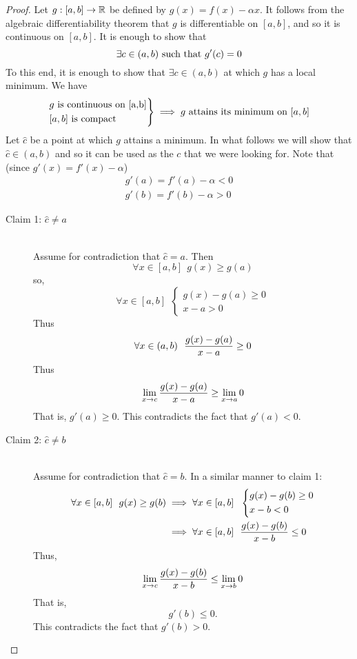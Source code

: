 \begin{proof}
    Let $g:[a,b] \to \mathbb{R}$ be defined by $g(x) = f(x) - \alpha x.$ It follows from the algebraic differentiability theorem that $g$ is differentiable on $[a,b]$, and so it is continuous on $[a,b]$. It is enough to show that
    $$
    \exists c \in (a,b) \text{ such that } g'(c) = 0
    $$
    To this end, it is enough to show that $\exists c \in (a,b)$ at which $g$ has a local minimum. We have
    $$
    \begin{rcases*}
        \text{$g$ is continuous on [a,b]} \\
        \text{$[a,b]$ is compact}
    \end{rcases*} \implies
    \text{$g$ attains its minimum on $[a,b]$}
    $$
    Let $\hat{c}$ be a point at which $g$ attains a minimum. In what follows we will show that $\hat{c}\in (a,b)$ and so it can be used as the $c$ that we were looking for. Note that (since $g'(x) = f'(x) - \alpha$)
    \begin{align*}
        g'(a) = f'(a) - \alpha < 0 \\
        g'(b) = f'(b) - \alpha > 0
    \end{align*}

    \begin{description}
        \item[Claim 1: $\hat{c} \not = a$ ]\leavevmode \\
        Assume for contradiction that $\hat{c} = a$. Then
        $$
        \forall x \in [a, b] ~~g(x) \geq g(a)
        $$
        so,
        $$
        \forall x \in [a,b] ~~\begin{cases*}
            g(x) - g(a) \geq 0 \\
            x-a > 0
        \end{cases*}
        $$
        Thus
        $$
        \forall x \in (a, b) ~~\frac{g(x) - g(a)}{x - a} \geq 0
        $$
        Thus
        $$
        \lim \limits_{x \to c} \frac{g(x) - g(a)}{x-a} \geq \lim \limits_{x \to a}0
        $$
        That is, $g'(a) \geq 0.$ This contradicts the fact that $g'(a) < 0$.
        \item[Claim 2: $\hat{c} \not = b$] \leavevmode\\
        Assume for contradiction that $\hat{c} = b$.
        In a similar manner to claim 1:
        \begin{align*}
            \forall x \in [a,b] ~~g(x) \geq g(b) 
            &\implies \forall x \in [a,b] ~~\begin{cases*}
                g(x) - g(b) \geq 0 \\
                x - b < 0
            \end{cases*} \\
            &\implies \forall x \in [a,b] ~~\slope{g(x)}{g(b)}{x}{b} \leq 0
        \end{align*}
        Thus,
        $$
        \lim \limits_{x \to c} \frac{g(x) - g(b)}{x-b} \leq \lim \limits_{x \to b}0
        $$
        That is,
        $$
        g'(b) \leq 0.
        $$
        This contradicts the fact that $g'(b) > 0.$
    \end{description}
\end{proof}

